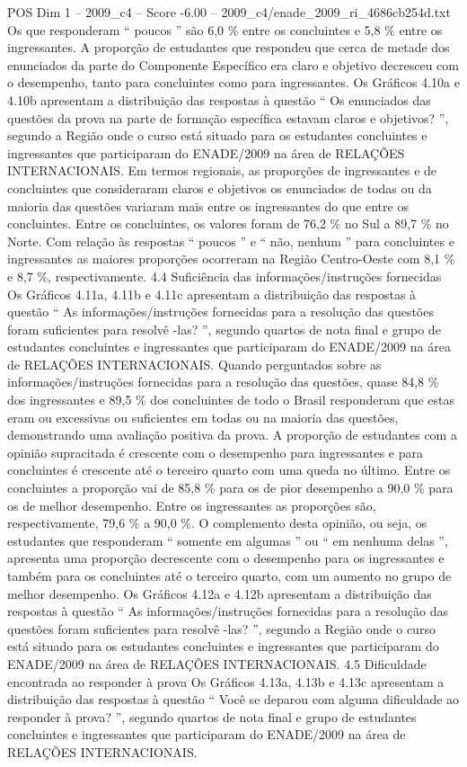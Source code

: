 \begin{textsample}{POS Dim 1 – 2009\_c4 – Score -6.00 – 2009\_c4/enade\_2009\_ri\_4686cb254d.txt}
Os que responderam “ poucos ” são 6,0 \% entre os concluintes e 5,8 \% entre os ingressantes.
A proporção de estudantes que respondeu que cerca de metade dos enunciados da parte do Componente Específico era claro e objetivo decresceu com o desempenho, tanto para concluintes como para ingressantes.
Os Gráficos 4.10a e 4.10b apresentam a distribuição das respostas à questão “ Os enunciados das questões da prova na parte de formação específica estavam claros e objetivos? ”, segundo a Região onde o curso está situado para os estudantes concluintes e ingressantes que participaram do ENADE/2009 na área de RELAÇÕES INTERNACIONAIS.
Em termos regionais, as proporções de ingressantes e de concluintes que consideraram claros e objetivos os enunciados de todas ou da maioria das questões variaram mais entre os ingressantes do que entre os concluintes.
Entre os concluintes, os valores foram de 76,2 \% no Sul a 89,7 \% no Norte.
Com relação às respostas “ poucos ” e “ não, nenhum ” para concluintes e ingressantes as maiores proporções ocorreram na Região Centro-Oeste com 8,1 \% e 8,7 \%, respectivamente. 4.4 Suficiência das informações/instruções fornecidas Os Gráficos 4.11a, 4.11b e 4.11c apresentam a distribuição das respostas à questão “ As informações/instruções fornecidas para a resolução das questões foram suficientes para resolvê -las? ”, segundo quartos de nota final e grupo de estudantes concluintes e ingressantes que participaram do ENADE/2009 na área de RELAÇÕES INTERNACIONAIS.
Quando perguntados sobre as informações/instruções fornecidas para a resolução das questões, quase 84,8 \% dos ingressantes e 89,5 \% dos concluintes de todo o Brasil responderam que estas eram ou excessivas ou suficientes em todas ou na maioria das questões, demonstrando uma avaliação positiva da prova.
A proporção de estudantes com a opinião supracitada é crescente com o desempenho para ingressantes e para concluintes é crescente até o terceiro quarto com uma queda no último.
Entre os concluintes a proporção vai de 85,8 \% para os de pior desempenho a 90,0 \% para os de melhor desempenho.
Entre os ingressantes as proporções são, respectivamente, 79,6 \% a 90,0 \%.
O complemento desta opinião, ou seja, os estudantes que responderam “ somente em algumas ” ou “ em nenhuma delas ”, apresenta uma proporção decrescente com o desempenho para os ingressantes e também para os concluintes até o terceiro quarto, com um aumento no grupo de melhor desempenho.
Os Gráficos 4.12a e 4.12b apresentam a distribuição das respostas à questão “ As informações/instruções fornecidas para a resolução das questões foram suficientes para resolvê -las? ”, segundo a Região onde o curso está situado para os estudantes concluintes e ingressantes que participaram do ENADE/2009 na área de RELAÇÕES INTERNACIONAIS. 4.5 Dificuldade encontrada ao responder à prova Os Gráficos 4.13a, 4.13b e 4.13c apresentam a distribuição das respostas à questão “ Você se deparou com alguma dificuldade ao responder à prova? ”, segundo quartos de nota final e grupo de estudantes concluintes e ingressantes que participaram do ENADE/2009 na área de RELAÇÕES INTERNACIONAIS.

\end{textsample}
